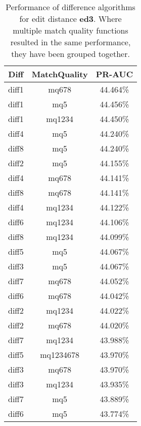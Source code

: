 \begin{table}[tbph]
\begin{center}
\begin{tabular}{|c|c||c|}
\hline
Diff & MatchQuality & PR-AUC  \\
\hline
\hline
diff1 & mq678 & 44.464\% \\
diff1 & mq5 & 44.456\% \\
diff1 & mq1234 & 44.450\% \\
diff4 & mq5 & 44.240\% \\
diff8 & mq5 & 44.240\% \\
diff2 & mq5 & 44.155\% \\
diff4 & mq678 & 44.141\% \\
diff8 & mq678 & 44.141\% \\
diff4 & mq1234 & 44.122\% \\
diff6 & mq1234 & 44.106\% \\
diff8 & mq1234 & 44.099\% \\
diff5 & mq5 & 44.067\% \\
diff3 & mq5 & 44.067\% \\
diff7 & mq678 & 44.052\% \\
diff6 & mq678 & 44.042\% \\
diff2 & mq1234 & 44.022\% \\
diff2 & mq678 & 44.020\% \\
diff7 & mq1234 & 43.988\% \\
diff5 & mq1234678 & 43.970\% \\
diff3 & mq678 & 43.970\% \\
diff3 & mq1234 & 43.935\% \\
diff7 & mq5 & 43.889\% \\
diff6 & mq5 & 43.774\% \\
\hline
\end{tabular}
\end{center}
\caption{Performance of difference algorithms for
  edit distance \textbf{ed3}.  Where multiple match
  quality functions resulted in the same performance, they
  have been grouped together.}
\label{tab:editlongbyed3}
\end{table}
